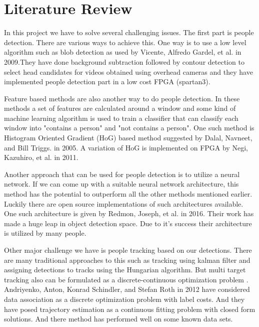 \documentclass[12pt,a4paper]{report}
\begin{document}
\section{Literature Review}
\par In this project we have to solve several challenging issues. The first part is people detection. There are various ways to achieve this. One way is to use a low level algorithm such as blob detection as used by Vicente, Alfredo Gardel, et al. \cite{1} in 2009.They have done background subtraction followed by contour detection to select head candidates for videos obtained using overhead cameras and they have implemented people detection part in a low cost FPGA (spartan3). 

\par Feature based methods are also another way to do people detection. In these methods a set of features are calculated around a window and some kind of machine learning algorithm is used to train a classifier that can classify each window into "contains a person" and "not contains a person". One such method is Histogram Oriented Gradient (HoG) based method suggested by Dalal, Navneet, and Bill Triggs. \cite{2} in 2005. A variation of HoG is implemented on FPGA by Negi, Kazuhiro, et al. \cite{3} in 2011.

\par Another approach that can be used for people detection is to utilize a neural network. If we can come up with a suitable neural network architecture, this method has the potential to outperform all the other methods mentioned earlier. Luckily there are open source implementations of such architectures available. One such architecture is given by Redmon, Joseph, et al. \cite{4} in 2016. Their work has made a huge leap in object detection space. Due to it's success their architecture is utilized by many people.

\par Other major challenge we have is people tracking based on our detections. There are many traditional approaches to this such as tracking using kalman filter and assigning detections to tracks using the Hungarian algorithm. But multi target tracking also can be formulated as a discrete-continuous optimization problem \cite{5}. Andriyenko, Anton, Konrad Schindler, and Stefan Roth \cite{5} in 2012 have considered data association as a discrete optimization problem with label costs. And they have posed trajectory estimation as a continuous fitting problem with closed form solutions. And there method has performed well on some known data sets.
\end{document}
